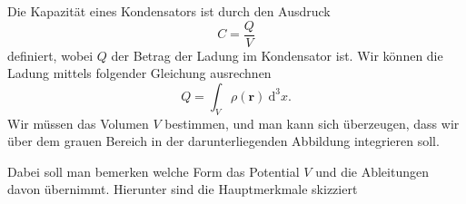 \documentclass[A4paper, 12pt]{amsart}
\begin{document}
Die Kapazität eines Kondensators ist durch den Ausdruck
%
\begin{equation*}
  C = \frac{Q}{V}
\end{equation*}
%
definiert, wobei $ Q $ der Betrag der Ladung im Kondensator ist.
Wir können die Ladung mittels folgender Gleichung ausrechnen
%
\begin{equation*}
  Q =
  \int_{V}
    \rho (\mathbf{r})
  \ \mathrm{d}^{3}x
  .
\end{equation*}
%
Wir müssen das Volumen $ V $ bestimmen, und man kann sich überzeugen,
dass wir über dem grauen Bereich in der darunterliegenden Abbildung
integrieren soll.
\begin{center}
  
\end{center}

Dabei soll man bemerken welche Form das Potential $ V $ und die Ableitungen
davon übernimmt. Hierunter sind die Hauptmerkmale skizziert
\begin{center}
  
\end{center}
\end{document}
